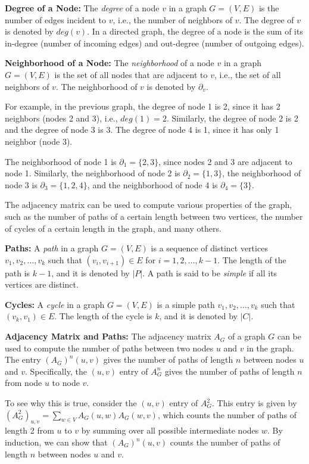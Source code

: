 \textbf{Degree of a Node:} The \textit{degree} of a node $v$ in a graph $G = (V,E)$ is the number of edges incident to $v$, i.e., the number of neighbors of $v$. The degree of $v$ is denoted by $deg(v)$. In a directed graph, the degree of a node is the sum of its in-degree (number of incoming edges) and out-degree (number of outgoing edges).

\textbf{Neighborhood of a Node:} The \textit{neighborhood} of a node $v$ in a graph $G = (V,E)$ is the set of all nodes that are adjacent to $v$, i.e., the set of all neighbors of $v$. The neighborhood of $v$ is denoted by $\partial_v$.

For example, in the previous graph, the degree of node 1 is 2, since it has 2 neighbors (nodes 2 and 3), i.e., $deg(1) = 2$. Similarly, the degree of node 2 is 2 and the degree of node 3 is 3. The degree of node 4 is 1, since it has only 1 neighbor (node 3).

The neighborhood of node 1 is $\partial_1 = \{2, 3\}$, since nodes 2 and 3 are adjacent to node 1. Similarly, the neighborhood of node 2 is $\partial_2 = \{1, 3\}$, the neighborhood of node 3 is $\partial_3 = \{1, 2, 4\}$, and the neighborhood of node 4 is $\partial_4 = \{3\}$.

The adjacency matrix can be used to compute various properties of the graph, such as the number of paths of a certain length between two vertices, the number of cycles of a certain length in the graph, and many others.


\textbf{Paths:} A \textit{path} in a graph $G=(V,E)$ is a sequence of distinct vertices $v_1, v_2, \ldots, v_k$ such that $(v_i, v_{i+1}) \in E$ for $i=1,2,\ldots,k-1$. The length of the path is $k-1$, and it is denoted by $|P|$. A path is said to be \textit{simple} if all its vertices are distinct.

\textbf{Cycles:} A \textit{cycle} in a graph $G=(V,E)$ is a simple path $v_1, v_2, \ldots, v_k$ such that $(v_k, v_1) \in E$. The length of the cycle is $k$, and it is denoted by $|C|$.

\textbf{Adjacency Matrix and Paths:} The adjacency matrix $A_G$ of a graph $G$ can be used to compute the number of paths between two nodes $u$ and $v$ in the graph. The entry $(A_G)^n(u,v)$ gives the number of paths of length $n$ between nodes $u$ and $v$. Specifically, the $(u,v)$ entry of $A_G^n$ gives the number of paths of length $n$ from node $u$ to node $v$.

To see why this is true, consider the $(u,v)$ entry of $A_G^2$. This entry is given by $(A_G^2)_{u,v} = \sum_{w \in V} A_G(u,w) A_G(w,v)$, which counts the number of paths of length 2 from $u$ to $v$ by summing over all possible intermediate nodes $w$. By induction, we can show that $(A_G)^n(u,v)$ counts the number of paths of length $n$ between nodes $u$ and $v$.

